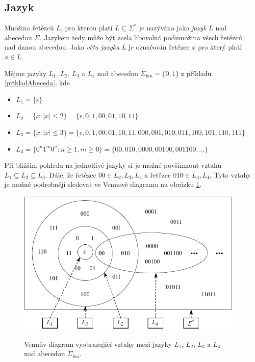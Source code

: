 \subsection*{Jazyk}
\begin{definice}
  Množina řetězců $L$, pro kterou platí $L \subseteq \Sigma^*$ je nazývána jako \emph{jazyk} $L$ nad abecedou $\Sigma$. Jazykem tedy může být
  zcela libovolná podmnožina všech řetězců nad danou abecedou. Jako \emph{věta jazyka} $L$ je označován řetězec $x$ pro který platí $x \in L$.
\end{definice}

\begin{priklad}
  Mějme jazyky $L_1$, $L_2$, $L_3$ a $L_4$ nad abecedou $\Sigma_{bin} = \{0, 1\}$ z příkladu \ref{prikladAbeceda}, kde
  \begin{itemize}
    \item $L_1 = \{\epsilon\}$
    \item $L_2 = \{x\!: |x| \leq 2\} = \{\epsilon, 0, 1, 00, 01, 10, 11\}$
    \item $L_3 = \{x\!: |x| \leq 3\} = \{\epsilon, 0, 1, 00, 01, 10, 11, 000, 001, 010, 011, 100, 101, 110, 111\}$
    \item $L_4 = \{0^n1^m0^n\!: n \geq 1, m \geq 0\} = \{00, 010, 0000 ,00100, 001100, \dots\}$
  \end{itemize}
  Při bližším pohledu na jednotlivé jazyky si je možné povšimnout vztahu $L_1 \subseteq L_2 \subseteq L_3$. Dále, že řetězec $00 \in L_2, L_3, L_4$
  a řetězec $010 \in L_3, L_4$. Tyto vztahy je možné podrobněji sledovat ve Vennově diagramu na obrázku \ref{obrJazyky}.

  \begin{figure}[h]\centering
    \centering
    \includegraphics[scale=1.1]{obrazky/JazykyPriklad.pdf}\\[1pt]

    \caption{Vennův diagram vyobrazující vztahy mezi jazyky $L_1$, $L_2$, $L_3$ a $L_4$ nad abecedou $\Sigma_{bin}$.}
    \label{obrJazyky}
  \end{figure}
\end{priklad}


